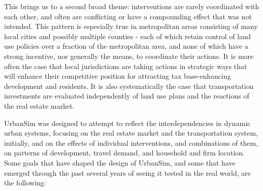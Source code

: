 This brings us to a second broad theme: interventions are rarely coordinated with each other, and often are conflicting or have a compounding effect that was not intended.  This pattern is especially true in metropolitan areas consisting of many local cities and possibly multiple counties - each of which retain control of land use policies over a fraction of the metropolitan area, and none of which have a strong incentive, nor generally the means, to coordinate their actions.  It is more often the case that local jurisdictions are taking actions in strategic ways that will enhance their competitive position for attracting tax base-enhancing development and residents.  It is also systematically the case that transportation investments are evaluated independently of land use plans and the reactions of the real estate market.

UrbanSim was designed to attempt to reflect the interdependencies in dynamic urban systems, focusing on the real estate market and the transportation system, initially, and on the effects of individual interventions, and combinations of them, on patterns of development, travel demand, and household and firm location.  Some goals that have shaped the design of UrbanSim, and some that have emerged through the past several years of seeing it tested in the real world, are the following:

